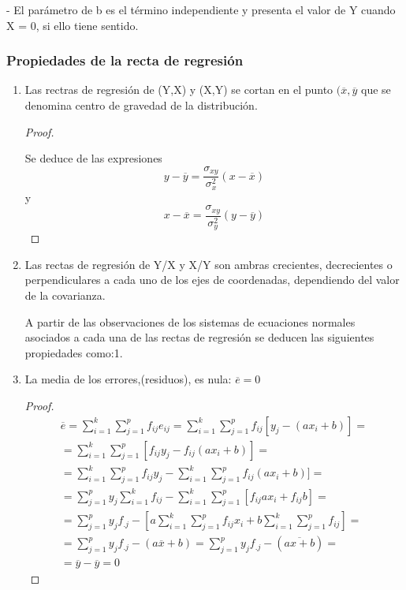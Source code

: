 \documentclass{article}
\begin{document}
	- El parámetro de b es el término independiente y presenta el valor de Y cuando X = 0, si ello tiene sentido.
	
	\subsubsection{Propiedades de la recta de regresión}
	
\begin{enumerate}

	
\item Las rectras de regresión de (Y,X) y (X,Y)  se cortan en el punto $(\overline{x},\overline{y}$ que se denomina centro de gravedad de la distribución.

\begin{proof}
$ $\newline

Se deduce de las expresiones
$$ y - \overline{y} = \frac{\sigma_{xy}}{\sigma_x^2} (x - \overline{x}) $$
y 
$$ x - \overline{x} = \frac{\sigma_{xy}}{\sigma_y^2} (y - \overline{y} ) $$
\end{proof}
\item Las rectas de regresión de Y/X y X/Y son ambras crecientes, decrecientes o perpendiculares a cada uno de los ejes de coordenadas, dependiendo del valor de la covarianza.

A partir de las observaciones de los sistemas de ecuaciones normales asociados a cada una de las rectas de regresión se deducen las siguientes propiedades como:1.

\item La media de los errores,(residuos), es nula: $\overline{e} = 0$

\begin{proof}
$ $\newline
\begin{align*}
\overline{e} = \sum_{i=1}^k\sum_{j=1}^p f_{ij}e_{ij} = \sum_{i=1}^k\sum_{j=1}^p f_{ij}[y_j - (ax_i +b)]  = \\
    = \sum_{i=1}^k\sum_{j=1}^p [f_{ij}y_j - f_ {ij}(ax_i +b)] = \\
    = \sum_{i=1}^k\sum_{j=1}^p f_{ij}y_j - \sum_{i=1}^k\sum_{j=1}^p f_ {ij}(ax_i +b)] = \\
    = \sum_{j=1}^p y_j \sum_{i=1}^k f_{ij} - \sum_{i=1}^k\sum_{j=1}^p [f_{ij}ax_i + f_{ij}b] = \\
    = \sum_{j=1}^p y_j f_{.j} - \left[a\sum_{i=1}^k\sum_{j=1}^p f_{ij}  x_i   +  b\sum_{i=1}^k\sum_{j=1}^p f_{ij}\right] = \\ 
     = \sum_{j=1}^p y_j f_{.j} - (a\overline{x}+b) = \sum_{j=1}^p y_j f_{.j} - (\overline{ax+b}) = \\
	= \overline{y} - \overline{y} = 0
\end{align*}
	

\end{proof}
\end{enumerate}
\end{document}
